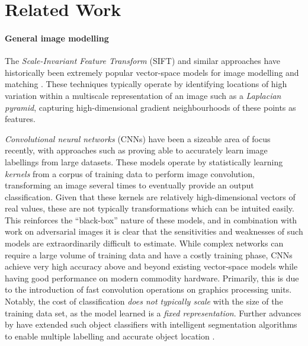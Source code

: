 \documentclass{mpaper}
\begin{document}
\section{Related Work}
\label{sec:related}

\paragraph{General image modelling}
The \emph{Scale-Invariant Feature Transform} (SIFT) and similar approaches have historically been extremely popular vector-space models for image modelling and matching \cite{SIFT,Sift-Variants-Comparison}.
These techniques typically operate by identifying locations of high variation within a multiscale representation of an image such as a \emph{Laplacian pyramid}, capturing high-dimensional gradient neighbourhoods of these points as features.

\emph{Convolutional neural networks} (CNNs) have been a sizeable area of focus recently, with approaches such as \citeauthor{ConvNet} \cite{ConvNet} proving able to accurately learn image labellings from large datasets.
These models operate by statistically learning \emph{kernels} from a corpus of training data to perform image convolution, transforming an image several times to eventually provide an output classification.
Given that these kernels are relatively high-dimensional vectors of real values, these are not typically transformations which can be intuited easily.
This reinforces the ``black-box'' nature of these models, and in combination with work on adversarial images \cite{AdversarialML} it is clear that the sensitivities and weaknesses of such models are extraordinarily difficult to estimate.
While complex networks can require a large volume of training data and have a costly training phase, CNNs achieve very high accuracy above and beyond existing vector-space models while having good performance on modern commodity hardware.
Primarily, this is due to the introduction of fast convolution operations on graphics processing units.
Notably, the cost of classification \emph{does not typically scale} with the size of the training data set, as the model learned is a \emph{fixed representation}.
Further advances by \citeauthor{MultilabelCNN} have extended such object classifiers with intelligent segmentation algorithms \cite{BING} to enable multiple labelling and accurate object location \cite{MultilabelCNN}.
\end{document}
